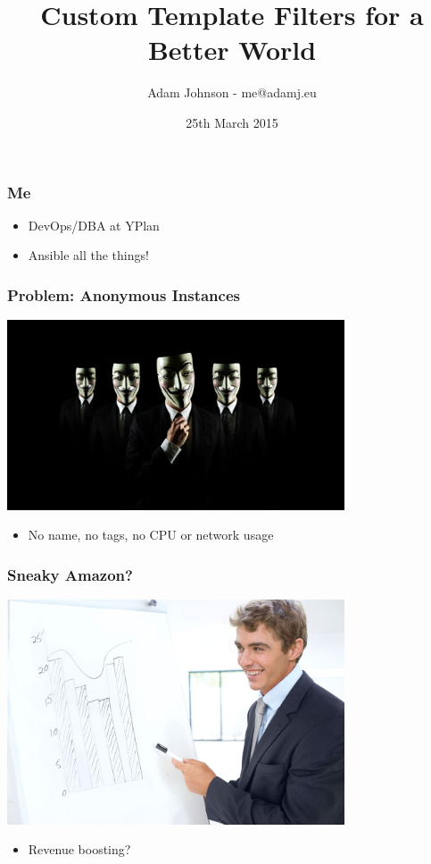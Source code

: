 \documentclass{beamer}
\title{Custom Template Filters for a Better World}
\author{Adam Johnson - me@adamj.eu}
\date{25th March 2015}
\begin{document}
\maketitle


\begin{frame}\frametitle{Me}

    \begin{itemize}
        \item DevOps/DBA at YPlan
        \item Ansible all the things!
    \end{itemize}

\end{frame}


\begin{frame}\frametitle{Problem: Anonymous Instances}

    \begin{center}
        \includegraphics[width=10cm]{anonymous}
    \end{center}

    \begin{itemize}
        \item No name, no tags, no CPU or network usage
    \end{itemize}

\end{frame}


\begin{frame}\frametitle{Sneaky Amazon?}

    \begin{center}
        \includegraphics[width=10cm]{look-i-made-a-graph}
    \end{center}

    \begin{itemize}
        \item Revenue boosting?
    \end{itemize}

\end{frame}
\end{document}
